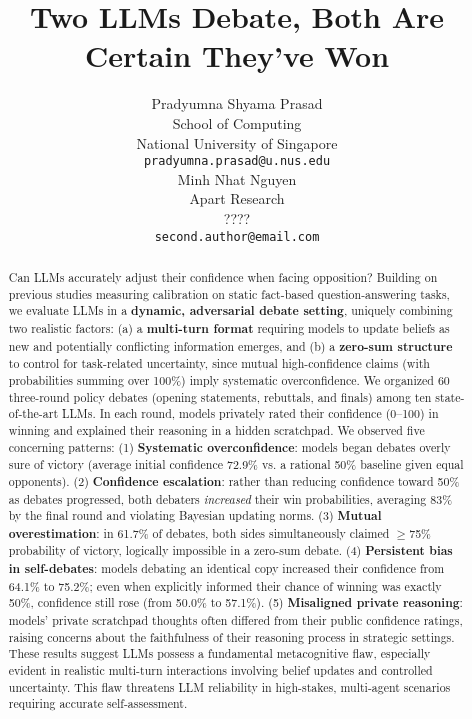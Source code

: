 \documentclass{article}
\title{Two LLMs Debate, Both Are Certain They've Won}
\author{%
Pradyumna Shyama Prasad \\ %
  School of Computing \\ %
  National University of Singapore \\ %
  \texttt{pradyumna.prasad@u.nus.edu} \\ %
  \And
  Minh Nhat Nguyen \\
  Apart Research \\
  ???? \\
  \texttt{second.author@email.com} \\
}
\begin{document}
\maketitle


\begin{abstract}
    Can LLMs accurately adjust their confidence when facing opposition? Building on previous studies measuring calibration on static fact-based question-answering tasks, we evaluate LLMs in a \textbf{dynamic, adversarial debate setting}, uniquely combining two realistic factors: (a) a \textbf{multi-turn format} requiring models to update beliefs as new and potentially conflicting information emerges, and (b) a \textbf{zero-sum structure} to control for task-related uncertainty, since mutual high-confidence claims (with probabilities summing over 100\%) imply systematic overconfidence. We organized 60 three-round policy debates (opening statements, rebuttals, and finals) among ten state-of-the-art LLMs. In each round, models privately rated their confidence (0--100) in winning and explained their reasoning in a hidden scratchpad. We observed five concerning patterns: (1) \textbf{Systematic overconfidence}: models began debates overly sure of victory (average initial confidence 72.9\% vs. a rational 50\% baseline given equal opponents). (2) \textbf{Confidence escalation}: rather than reducing confidence toward 50\% as debates progressed, both debaters \textit{increased} their win probabilities, averaging 83\% by the final round and violating Bayesian updating norms. (3) \textbf{Mutual overestimation}: in 61.7\% of debates, both sides simultaneously claimed $\geq$75\% probability of victory, logically impossible in a zero-sum debate. (4) \textbf{Persistent bias in self-debates}: models debating an identical copy increased their confidence from 64.1\% to 75.2\%; even when explicitly informed their chance of winning was exactly 50\%, confidence still rose (from 50.0\% to 57.1\%). (5) \textbf{Misaligned private reasoning}: models' private scratchpad thoughts often differed from their public confidence ratings, raising concerns about the faithfulness of their reasoning process in strategic settings. These results suggest LLMs possess a fundamental metacognitive flaw, especially evident in realistic multi-turn interactions involving belief updates and controlled uncertainty. This flaw threatens LLM reliability in high-stakes, multi-agent scenarios requiring accurate self-assessment.

\end{abstract}
\end{document}
